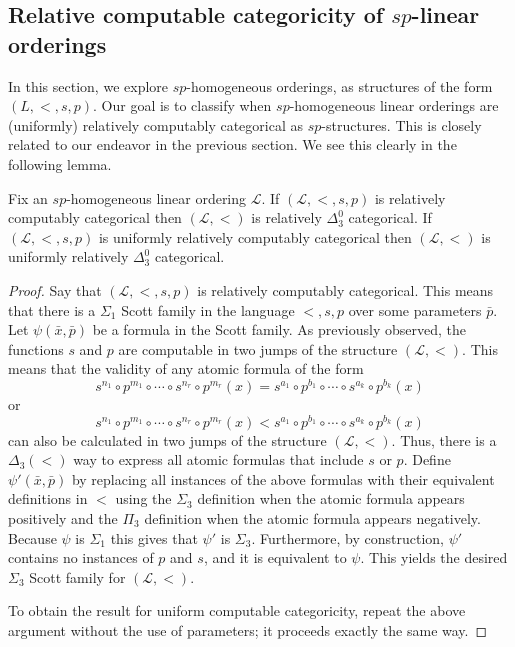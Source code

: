 \documentclass[11pt]{amsart}
\theoremstyle{definition}
\def\L{\mathcal L}
\begin{document}
\subsection{Relative computable categoricity of $sp$-linear orderings}

In this section, we explore $sp$-homogeneous orderings, as structures of the form $(L,<,s,p)$.
Our goal is to classify when $sp$-homogeneous linear orderings are (uniformly) relatively computably categorical as $sp$-structures.
This is closely related to our endeavor in the previous section.
We see this clearly in the following lemma.

\begin{lemma}\label{lem:ConnectingSpTo<}
    Fix an $sp$-homogeneous linear ordering $\L$.
    If $(\L,<,s,p)$ is relatively computably categorical then $(\L,<)$ is relatively $\Delta_3^0$ categorical.
    If $(\L,<,s,p)$ is uniformly relatively computably categorical then $(\L,<)$ is uniformly relatively $\Delta_3^0$ categorical.
\end{lemma}

\begin{proof}
    Say that $(\L,<,s,p)$ is relatively computably categorical.
    This means that there is a $\Sigma_1$ Scott family in the language $<,s,p$ over some parameters $\bar{p}$.
    Let $\psi(\bar{x},\bar{p})$ be a formula in the Scott family. 
    As previously observed, the functions $s$ and $p$ are computable in two jumps of the structure $(\L,<)$.
    This means that the validity of any atomic formula of the form 
    \[s^{n_1}\circ p^{m_1}\circ\cdots\circ s^{n_r}\circ p^{m_r}(x)=s^{a_1}\circ p^{b_1}\circ\cdots\circ s^{a_k}\circ p^{b_k}(x)\]
    or
    \[s^{n_1}\circ p^{m_1}\circ\cdots\circ s^{n_r}\circ p^{m_r}(x)<s^{a_1}\circ p^{b_1}\circ\cdots\circ s^{a_k}\circ p^{b_k}(x)\]
    can also be calculated in two jumps of the structure $(\L,<)$.
    Thus, there is a $\Delta_3(<)$ way to express all atomic formulas that include $s$ or $p$.
    Define $\psi'(\bar{x},\bar{p})$ by replacing all instances of the above formulas with their equivalent definitions in $<$ using the $\Sigma_3$ definition when the atomic formula appears positively and the $\Pi_3$ definition when the atomic formula appears negatively.
    Because $\psi$ is $\Sigma_1$ this gives that $\psi'$ is $\Sigma_3$.
    Furthermore, by construction, $\psi'$ contains no instances of $p$ and $s$, and it is equivalent to $\psi$.
    This yields the desired $\Sigma_3$ Scott family for $(\L,<)$.

    To obtain the result for uniform computable categoricity, repeat the above argument without the use of parameters; it proceeds exactly the same way.
\end{proof}
\end{document}
